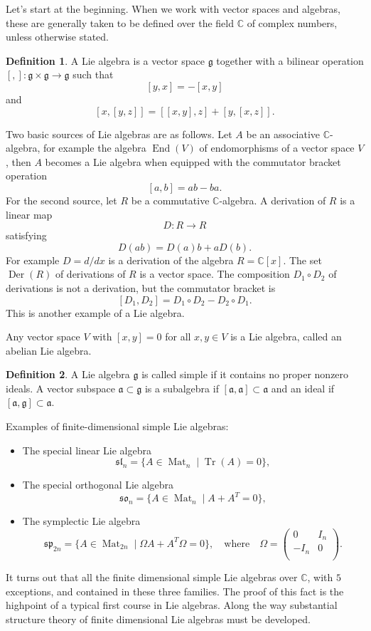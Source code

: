 \documentclass[12pt]{article}
\theoremstyle{plain}
\theoremstyle{definition}
\newtheorem{defn}{Definition}[section]
\numberwithin{equation}{section}
\DeclareMathOperator{\Der}{Der}
\DeclareMathOperator{\en}{End}
\DeclareMathOperator{\tr}{Tr}
\DeclareMathOperator{\Mat}{Mat}
\newcommand{\C}{\mathbb{C}}
\newcommand{\g}{\mathfrak{g}}
\newcommand{\sll}{\mathfrak{sl}}
\newcommand{\soo}{\mathfrak{so}}
\newcommand{\spp}{\mathfrak{sp}}
\newcommand{\ma}{\mathfrak{a}}
\newcommand{\tbt}[4]{\left(\begin{array}{cc} #1 & #2 \\ #3 & #4 \\ \end{array}\right)}
\begin{document}

Let's start at the beginning. When we work with vector spaces and algebras, these are generally taken to be defined over the field $\C$ of complex numbers, unless otherwise stated.
\begin{defn}
A Lie algebra is a vector space $\g$ together with a bilinear operation $[,] : \g \times \g \rightarrow \g$ such that
\[
[y, x] = -[x, y]
\]
and
\[
[x, [y, z]] = [[x, y], z] + [y, [x, z]].
\]
\end{defn}
Two basic sources of Lie algebras are as follows. Let $A$ be an associative $\C$-algebra, for example the algebra $\en(V)$ of endomorphisms of a vector space $V$, then $A$ becomes a Lie algebra when equipped with the commutator bracket operation
\[
[a, b] = ab - ba.
\]
For the second source, let $R$ be a commutative $\C$-algebra. A derivation of $R$ is a linear map
\[
D : R \rightarrow R
\]
satisfying
\[
D(ab) = D(a)b + aD(b).
\]
For example $D = d/dx$ is a derivation of the algebra $R = \C[x]$.
The set $\Der(R)$ of derivations of $R$ is a vector space. The composition $D_1 \circ D_2$ of derivations is not a derivation, but the commutator bracket is
\[
[D_1, D_2] = D_1 \circ D_2 - D_2 \circ D_1.
\]
This is another example of a Lie algebra.


Any vector space $V$ with $[x, y] = 0$ for all $x, y \in V$ is a Lie algebra, called an abelian Lie algebra.

\begin{defn}
A Lie algebra $\g$ is called simple if it contains no proper nonzero ideals. A vector subspace $\ma \subset \g$ is a subalgebra if $[\ma, \ma] \subset \ma$ and an ideal if $[\ma, \g] \subset \ma$.
\end{defn}



Examples of finite-dimensional simple Lie algebras:
\begin{itemize}
\item The special linear Lie algebra
\[
\sll_n = \{A \in \Mat_{n} \mid \tr(A) = 0 \},
\]

\item The special orthogonal Lie algebra
\[
\soo_n = \{A \in \Mat_{n} \mid A + A^T = 0\},
\]

\item The symplectic Lie algebra
\[
\spp_{2n} = \{A \in \Mat_{2n} \mid \Omega A + A^T \Omega = 0\}, \quad \text{where} \quad \Omega = \tbt{0}{I_n}{-I_n}{0}.
\]
\end{itemize}
It turns out that all the finite dimensional simple Lie algebras over $\C$, with $5$ exceptions, and contained in these three families. The proof of this fact is the highpoint of a typical first course in Lie algebras. Along the way substantial structure theory of finite dimensional Lie algebras must be developed.
\end{document}
